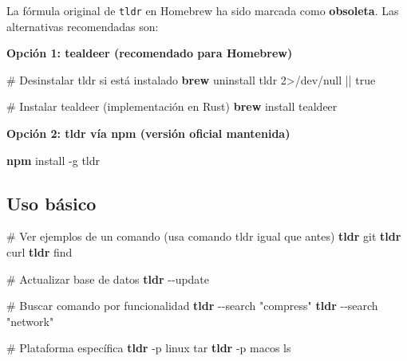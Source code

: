 \documentclass[
  11pt,
  letterpaper,
  oneside,
  openany]{scrbook}
\newenvironment{Shaded}{}{}
\newcommand{\AttributeTok}[1]{\textcolor[rgb]{0.84,0.23,0.29}{#1}}
\newcommand{\CommentTok}[1]{\textcolor[rgb]{0.42,0.45,0.49}{#1}}
\newcommand{\DecValTok}[1]{\textcolor[rgb]{0.00,0.36,0.77}{#1}}
\newcommand{\ExtensionTok}[1]{\textcolor[rgb]{0.84,0.23,0.29}{\textbf{#1}}}
\newcommand{\FunctionTok}[1]{\textcolor[rgb]{0.44,0.26,0.76}{#1}}
\newcommand{\KeywordTok}[1]{\textcolor[rgb]{0.84,0.23,0.29}{#1}}
\newcommand{\NormalTok}[1]{\textcolor[rgb]{0.14,0.16,0.18}{#1}}
\newcommand{\OperatorTok}[1]{\textcolor[rgb]{0.14,0.16,0.18}{#1}}
\newcommand{\StringTok}[1]{\textcolor[rgb]{0.01,0.18,0.38}{#1}}
\begin{document}
\begin{tcolorbox}[enhanced jigsaw, coltitle=black, breakable, arc=.35mm, toprule=.15mm, colbacktitle=quarto-callout-warning-color!10!white, colframe=quarto-callout-warning-color-frame, opacityback=0, colback=white, bottomtitle=1mm, bottomrule=.15mm, rightrule=.15mm, left=2mm, toptitle=1mm, leftrule=.75mm, title=\textcolor{quarto-callout-warning-color}{\faExclamationTriangle}\hspace{0.5em}{⚠️ Migración desde tldr}, titlerule=0mm, opacitybacktitle=0.6]

La fórmula original de \texttt{tldr} en Homebrew ha sido marcada como
\textbf{obsoleta}. Las alternativas recomendadas son:

\textbf{Opción 1: tealdeer (recomendado para Homebrew)}

\begin{Shaded}
\begin{Highlighting}[]
\CommentTok{\# Desinstalar tldr si está instalado}
\ExtensionTok{brew}\NormalTok{ uninstall tldr }\DecValTok{2}\OperatorTok{\textgreater{}}\NormalTok{/dev/null }\KeywordTok{||} \FunctionTok{true}

\CommentTok{\# Instalar tealdeer (implementación en Rust)}
\ExtensionTok{brew}\NormalTok{ install tealdeer}
\end{Highlighting}
\end{Shaded}

\textbf{Opción 2: tldr vía npm (versión oficial mantenida)}

\begin{Shaded}
\begin{Highlighting}[]
\ExtensionTok{npm}\NormalTok{ install }\AttributeTok{{-}g}\NormalTok{ tldr}
\end{Highlighting}
\end{Shaded}

\end{tcolorbox}

\subsection{Uso básico}\label{uso-buxe1sico-7}

\begin{Shaded}
\begin{Highlighting}[]
\CommentTok{\# Ver ejemplos de un comando (usa comando \textquotesingle{}tldr\textquotesingle{} igual que antes)}
\ExtensionTok{tldr}\NormalTok{ git}
\ExtensionTok{tldr}\NormalTok{ curl}
\ExtensionTok{tldr}\NormalTok{ find}

\CommentTok{\# Actualizar base de datos}
\ExtensionTok{tldr} \AttributeTok{{-}{-}update}

\CommentTok{\# Buscar comando por funcionalidad}
\ExtensionTok{tldr} \AttributeTok{{-}{-}search} \StringTok{"compress"}
\ExtensionTok{tldr} \AttributeTok{{-}{-}search} \StringTok{"network"}

\CommentTok{\# Plataforma específica}
\ExtensionTok{tldr} \AttributeTok{{-}p}\NormalTok{ linux tar}
\ExtensionTok{tldr} \AttributeTok{{-}p}\NormalTok{ macos ls}
\end{Highlighting}
\end{Shaded}
\end{document}
